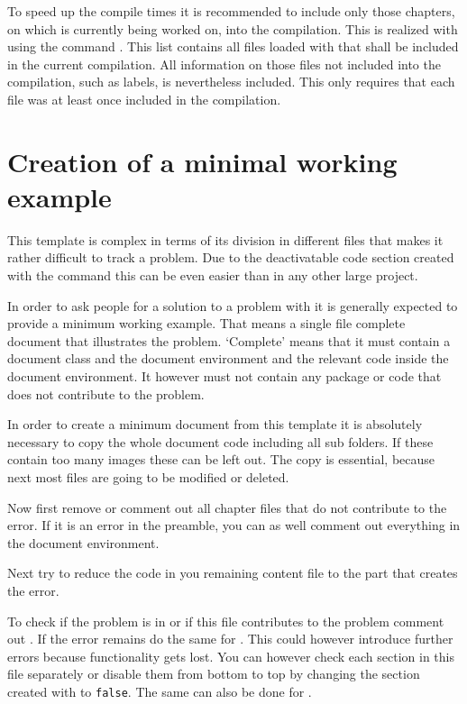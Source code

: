 To speed up the compile times it is recommended to include only those chapters, on which is currently being worked on, into the compilation.
This is realized with \latex using the command . This list contains all files loaded with  that shall be included in the current compilation. All information on those files not included into the compilation, such as labels, is nevertheless included. This only requires that each file was at least once included in the compilation.

\section{Creation of a minimal working example}
\label{sec:doc:faq:mwe}

This template is complex in terms of its division in different files that makes it rather difficult to track a problem. Due to the deactivatable code section created with the command  this can be even easier than in any other large \latex project.

In order to ask people for a solution to a problem with \latex it is generally expected to provide a minimum working example. That means a single file \latex complete document that illustrates the problem. `Complete’ means that it must contain a document class and the document environment and the relevant code inside the document environment. It however must not contain any package or code that does not contribute to the problem.

In order to create a minimum document from this template it is absolutely necessary to copy the whole document code including all sub folders. If these contain too many images these can be left out. The copy is essential, because next most files are going to be modified or deleted.

Now first remove or comment out all chapter files that do not contribute to the error. If it is an error in the preamble, you can as well comment out everything in the document environment.

Next try to reduce the code in you remaining content file to the part that creates the error.

To check if the problem is in  or if this file contributes to the problem comment out . If the error remains do the same for . This could however introduce further errors because functionality gets lost. You can however check each section in this file separately or disable them from bottom to top by changing the section created with  to \texttt{false}. The same can also be done for .

